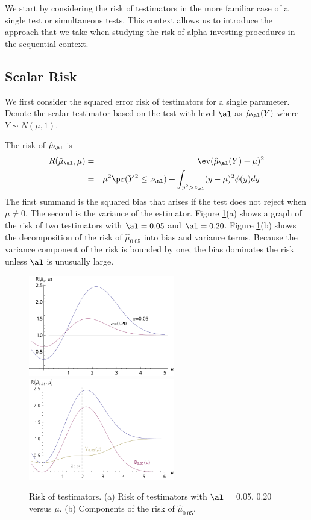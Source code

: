 \documentclass[12pt]{article}
\begin{document}
We start by considering the risk of testimators in the more familiar case of a
single test or simultaneous tests.  This context allows us to introduce the
approach that we take when studying the risk of alpha investing procedures in
the sequential context.



\subsection{ Scalar Risk }

We first consider the squared error risk of testimators for a single parameter.
  Denote the scalar testimator based on the test with level $\al$ as
 $\hat\mu_\al(Y)$ where $Y \sim N(\mu,1)$.

The risk of $\hat\mu_\al$ is
 \begin{eqnarray}
   R(\hat\mu_\al,\mu) 
     &=& \ev(\hat\mu_\al(Y) - \mu)^2  \cr
     &=& \mu^2 \pr(Y^2 \le z_\al) 
         + \int_{y^2>z_\al} (y-\mu)^2 \phi(y) dy \;.
 \label{eq:risk_mu_al}
 \end{eqnarray}
 The first summand is the squared bias that arises if the test does not reject
 when $\mu \ne 0$.  The second is the variance of the estimator.  Figure
 \ref{fig:risk}(a) shows a graph of the risk of two testimators with $\al=0.05$
 and $\al = 0.20$.  Figure \ref{fig:risk}(b) shows the decomposition of the risk
 of $\hat\mu_{0.05}$ into bias and variance terms.  Because the variance
 component of the risk is bounded by one, the bias dominates the risk unless
 $\al$ is unusually large.


 \begin{figure}
 \caption{ \label{fig:risk} Risk of testimators. (a) Risk of testimators with
$\al$ = 0.05, 0.20 versus $\mu$. (b) Components of the risk of $\hat\mu_{0.05}$. }
 \centerline{ 
   \includegraphics[width=2.5in]{figures/risk_a}
   \includegraphics[width=2.5in]{figures/risk_b} }
 \end{figure}
\end{document}
